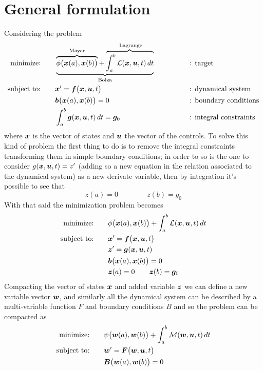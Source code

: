 \section{General formulation}
	Considering the problem
	\begin{align*}
		\textrm{minimize:} \qquad & \underbrace{ \overbrace{ \phi\big(\boldsymbol{x}(a), \boldsymbol{x}(b)\big)}^\textrm{Mayer} + \overbrace{\int_a^b \mathcal L(\boldsymbol{x}, \boldsymbol{u},t)\, dt}^\textrm{ Lagrange}}_\textrm{Bolza} \qquad \qquad && \textrm{: target} \\
		\textrm{subject to:} \qquad & \boldsymbol{x}' = \boldsymbol{f}\big(\boldsymbol{x},\boldsymbol{u},t\big)  && \textrm{: dynamical system} \\
		& \boldsymbol{b}\big(\boldsymbol{x}(a),\boldsymbol{x}(b)\big) = 0 && \textrm{: boundary conditions} \\
		& \int_a^b \boldsymbol{g}(\boldsymbol{x},\boldsymbol{u},  t)\, dt = \boldsymbol{g}_0 && \textrm{: integral constraints}
	\end{align*}
	where $\boldsymbol{x}$ is the vector of states and $\boldsymbol{u}$ the vector of the controls. To solve this kind of problem the first thing to do is to remove the integral constraints transforming them in simple boundary conditions; in order to so is the one to consider $g(\boldsymbol{x},\boldsymbol{u},t) = z'$  (adding so a new equation in the relation associated to the dynamical system) as a new derivate variable, then by integration it's possible to see that
	\[ z(a) = 0 \qquad \qquad z(b) = g_0 \]
	With that said the minimization problem becomes
	\begin{align*}
		\textrm{minimize:} \qquad & \phi\big(\boldsymbol{x}(a), \boldsymbol{x}(b)\big) + \int_a^b \mathcal L(\boldsymbol{x}, \boldsymbol{u},t)\, dt  \\
		\textrm{subject to:} \qquad & \boldsymbol{x}' = \boldsymbol{f}\big(\boldsymbol{x},\boldsymbol{u},t\big)   \\
		& \boldsymbol{z}' = \boldsymbol{g}(\boldsymbol{x}, \boldsymbol{u}, t) \\
		& \boldsymbol{b}\big(\boldsymbol{x}(a),\boldsymbol{x}(b)\big) = 0 \\
		& \boldsymbol{z}(a) = 0 \qquad \boldsymbol{z}(b) = \boldsymbol{g}_0
	\end{align*}
	Compacting the vector of states $\boldsymbol{x}$ and added variable $\boldsymbol{z}$ we can define a new variable vector $\boldsymbol{w}$, and similarly all the dynamical system can be described by a multi-variable function $F$ and boundary conditions $B$ and so the problem can be compacted as
	\begin{align*}
		\textrm{minimize:} \qquad & \psi\big(\boldsymbol{w}(a), \boldsymbol{w}(b)\big) + \int_a^b \mathcal M(\boldsymbol{w}, \boldsymbol{u},t)\, dt  \\
		\textrm{subject to:} \qquad & \boldsymbol{w}' = \boldsymbol{F}\big(\boldsymbol{w},\boldsymbol{u},t\big)   \\
		& \boldsymbol{B}\big(\boldsymbol{w}(a),\boldsymbol{w}(b)\big) = 0 
	\end{align*}
	
